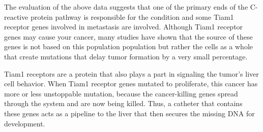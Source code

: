 \documentclass{article}
\begin{document}
The evaluation of the above data suggests that one of the primary ends of the C-reactive protein pathway is responsible for the condition and some Tiam1 receptor genes involved in metastasis are involved. Although Tiam1 receptor genes may cause your cancer, many studies have shown that the source of these genes is not based on this population population but rather the cells as a whole that create mutations that delay tumor formation by a very small percentage.

Tiam1 receptors are a protein that also plays a part in signaling the tumor's liver cell behavior. When Tiam1 receptor genes mutated to proliferate, this cancer has more or less unstoppable mutation, because the cancer-killing genes spread through the system and are now being killed. Thus, a catheter that contains these genes acts as a pipeline to the liver that then secures the missing DNA for development.
\end{document}

